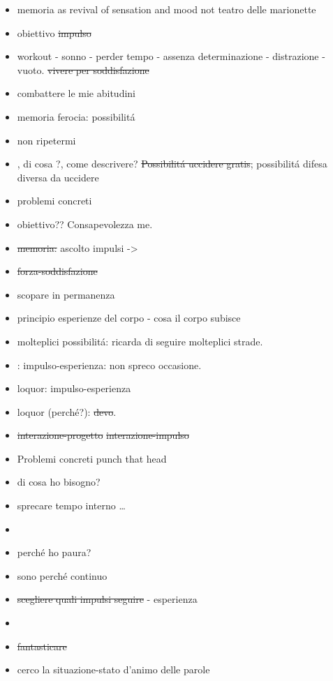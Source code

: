 \begin{itemize}
\item memoria as revival of sensation and mood not teatro delle marionette
\item obiettivo \sout{impulso}
\item workout - sonno - perder tempo - assenza determinazione - distrazione - vuoto.  \sout{vivere per soddisfazione}
\item combattere le mie abitudini
\item memoria ferocia: possibilit\'a
\item non ripetermi
\item {}, di cosa ?, come descrivere?
\sout{Possibilit\'a uccidere gratis}; possibilit\'a difesa diversa da uccidere
\item problemi concreti
\item obiettivo?? Consapevolezza me.
\item \sout{memoria: } ascolto impulsi -> 
\item \sout{forza-soddisfazione} 
\item scopare in permanenza
\item principio esperienze del corpo - cosa il corpo subisce
\item molteplici possibilit\'a: ricarda di seguire molteplici strade.
\item {}: impulso-esperienza: non spreco occasione.
\item loquor: impulso-esperienza
\item loquor (perch\'e?): \sout{devo}.
\item {} \sout{interazione-progetto} \sout{interazione-impulso}
\item Problemi concreti punch that head
\item di cosa ho bisogno?
\item sprecare tempo interno \ldots {}
\item {}
\item perch\'e ho paura?
\item sono  perch\'e continuo 
\item \sout{scegliere quali impulsi seguire} - esperienza
\item {}
\item {} \sout{fantasticare}
\item cerco la situazione-stato d'animo delle parole

\end{itemize}
